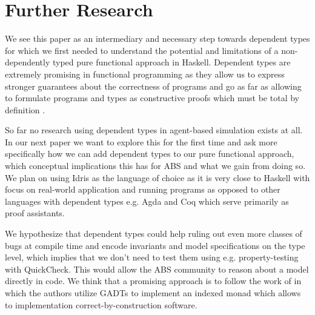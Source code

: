 \section{Further Research}
\label{sec:further_research}
We see this paper as an intermediary and necessary step towards dependent types for which we first needed to understand the potential and limitations of a non-dependently typed pure functional approach in Haskell. Dependent types are extremely promising in functional programming as they allow us to express stronger guarantees about the correctness of programs and go as far as allowing to formulate programs and types as constructive proofs which must be total by definition \cite{thompson_type_1991, mckinna_why_2006, altenkirch_pi_2010}.

So far no research using dependent types in agent-based simulation exists at all. In our next paper we want to explore this for the first time and ask more specifically how we can add dependent types to our pure functional approach, which conceptual implications this has for ABS and what we gain from doing so. We plan on using Idris \cite{brady_idris_2013} as the language of choice as it is very close to Haskell with focus on real-world application and running programs as opposed to other languages with dependent types e.g. Agda and Coq which serve primarily as proof assistants.

We hypothesize that dependent types could help ruling out even more classes of bugs at compile time and encode invariants and model specifications on the type level, which implies that we don't need to test them using e.g. property-testing with QuickCheck. This would allow the ABS community to reason about a model directly in code. We think that a promising approach is to follow the work of \cite{brady_correct-by-construction_2010, brady_idris_2011, brady_programming_2013, fowler_dependent_2014, brady_state_2016} in which the authors utilize GADTs to implement an indexed monad which allows to implementation correct-by-construction software.

